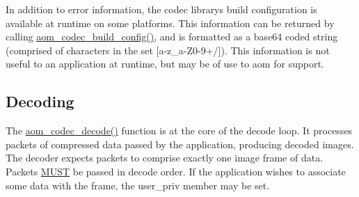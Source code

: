 In addition to error information, the codec library\textquotesingle{}s build configuration is available at runtime on some platforms. This information can be returned by calling \hyperlink{group__codec_gaf72432504daf378befd8b3c122f14c01}{aom\+\_\+codec\+\_\+build\+\_\+config()}, and is formatted as a base64 coded string (comprised of characters in the set \mbox{[}a-\/z\+\_\+a-\/\+Z0-\/9+/\mbox{]}). This information is not useful to an application at runtime, but may be of use to aom for support. \hypertarget{usage_decode}{}\subsection{Decoding}\label{usage_decode}
The \hyperlink{group__decoder_gab03fdb999d1f83a5896869a3ba5f68f7}{aom\+\_\+codec\+\_\+decode()} function is at the core of the decode loop. It processes packets of compressed data passed by the application, producing decoded images. The decoder expects packets to comprise exactly one image frame of data. Packets \hyperlink{rfc2119_MUST}{M\+U\+ST} be passed in decode order. If the application wishes to associate some data with the frame, the {\ttfamily user\+\_\+priv} member may be set.

